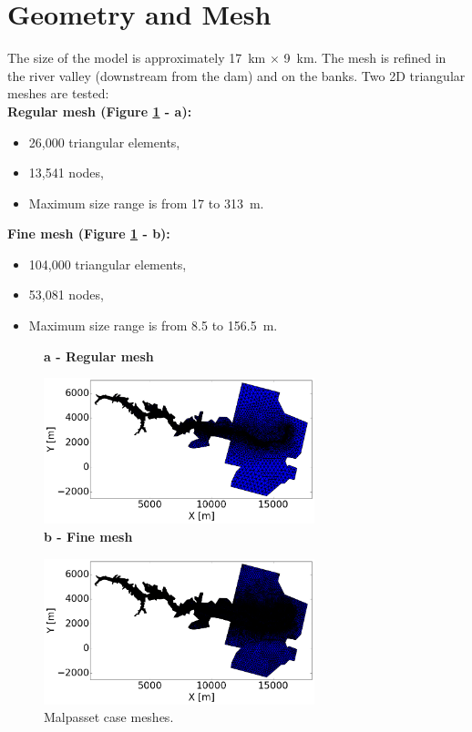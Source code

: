 \section{Geometry and Mesh}
The size of the model is approximately  17~km $\times$ 9~km. The mesh is refined in the river valley (downstream from the dam) and on the banks.
Two 2D triangular meshes are tested: \\
\textbf{Regular mesh (Figure \ref{fig:malpasset:Mesh} - a):}
\begin{itemize}
\itemsep0em
\item 26,000 triangular elements,
\item 13,541 nodes,
\item Maximum size range is from 17 to 313~m.
\end{itemize}
\textbf{Fine mesh (Figure \ref{fig:malpasset:Mesh} - b):}
\begin{itemize}
\itemsep0em
\item 104,000 triangular elements,
\item 53,081 nodes,
\item Maximum size range is from 8.5 to 156.5~m.
\end{itemize}
\begin{figure}[H]
  \centering
  \textbf{a - Regular mesh}\par\medskip
  \includegraphics[width=0.7\textwidth]{img/Mesh_small.png} \\
  \textbf{b - Fine mesh}\par\medskip
  \includegraphics[width=0.7\textwidth]{img/Mesh_large.png}
  \caption{Malpasset case meshes.}\label{fig:malpasset:Mesh}
\end{figure}
